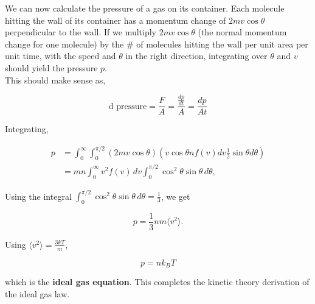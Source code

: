 \documentclass[svgnames]{article}     %
\begin{document}
We can now calculate the pressure of a gas on its container. Each molecule
hitting the wall of its container has a momentum change of $2mv \cos \theta$
perpendicular to the wall. If we multiply $2mv\cos\theta$ (the normal momentum
change for one molecule) by the \# of molecules hitting the wall per unit area
per unit time, with the speed and $\theta$ in the right direction, integrating
over $\theta$ and $v$ should yield the pressure $p$. \\

This should make sense as, 

\[
\text{d pressure} = \frac{F}{A} = \frac{\frac{dp}{dt}}{A} = \frac{dp}{At}
\] \vspace{5px}

Integrating, 

\begin{align*}
  p &= \int_{0}^{\infty} \int_{0}^{\pi/2}  (2mv\cos\theta) \left( v\cos\theta
  n f(v) dv \frac{1}{2}\sin\theta d\theta \right) \\
    &= mn \int_{0}^{\infty} v^2 f(v) \, dv \int_{0}^{\pi/2} \cos^2\theta
    \sin\theta \, d\theta,
\end{align*}  

Using the integral $\int_{0}^{\pi/2} \cos^2\theta\sin\theta \, d\theta
= \frac{1}{3}$, we get

\[
  \boxed{p = \frac{1}{3}nm\langle v^2 \rangle.}
\] \vspace{5px}

Using $\langle v^2 \rangle = \frac{3kT}{m}$, 

\[
  \boxed{p = nk_BT}
\] \vspace{5px}

which is the \textbf{ideal gas equation}. This completes the kinetic theory
derivation of the ideal gas law.
\end{document}
